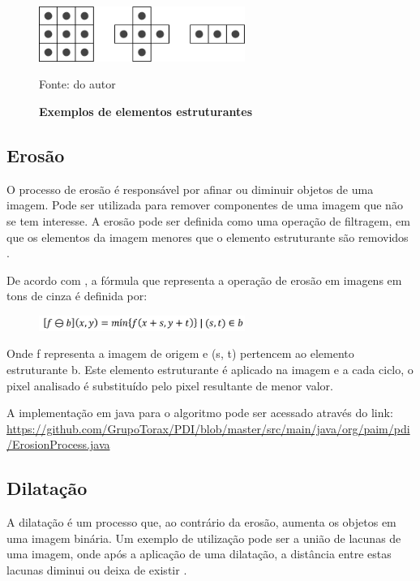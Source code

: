 \documentclass[
	12pt,				%
	oneside,			%
	a4paper,			%
	english,			%
	french,				%
	spanish,			%
	brazil,				%
	]{abntex2}
\begin{document}
\begin{figure}[ht]
\centering
\caption{\textbf{Exemplos de elementos estruturantes}}
\includegraphics[width=0.6\textwidth]{imagens/elemento_estruturante.png}

Fonte: do autor
\label{fig:elementro_estruturante}
\end{figure}

\subsection{Erosão}
O processo de erosão é responsável por afinar ou diminuir objetos de uma imagem. Pode ser utilizada para remover componentes de uma imagem que não se tem interesse. A erosão pode ser definida como uma operação de filtragem, em que os elementos da imagem menores que o elemento estruturante são removidos \cite{gonzalesWoods:2008}.

De acordo com \citet{pedriniSchwartz:2008}, a fórmula que representa a operação de erosão em imagens em tons de cinza é definida por:

\begin{figure}[ht]
\centering
\includegraphics[width=0.6\textwidth]{imagens/erosao_formula.png}
\end{figure}

Onde f representa a imagem de origem e (s, t) pertencem ao elemento estruturante b. Este elemento estruturante é aplicado na imagem e a cada ciclo, o pixel analisado é substituído pelo pixel resultante de menor valor.

A implementação em java para o algoritmo pode ser acessado através do link:
\url{https://github.com/GrupoTorax/PDI/blob/master/src/main/java/org/paim/pdi/ErosionProcess.java}

\subsection{Dilatação}

A dilatação é um processo que, ao contrário da erosão, aumenta os objetos em uma imagem binária. Um exemplo de utilização pode ser a união de lacunas de uma imagem, onde após a aplicação de uma dilatação, a distância entre estas lacunas diminui ou deixa de existir \cite{gonzalesWoods:2008}. 
\end{document}
